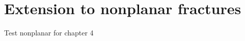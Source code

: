 \section{Extension to nonplanar fractures}
\label{section: Chapter4/nonplanar}

Test nonplanar for chapter 4